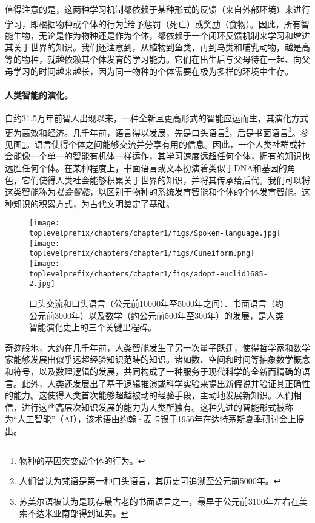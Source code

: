 \documentclass[../../book-main.tex]{subfiles}
\begin{document}
值得注意的是，这两种学习机制都依赖于某种形式的反馈（来自外部环境）来进行学习，即根据物种或个体的行为\footnote{物种的基因突变或个体的行为。}给予惩罚（死亡）或奖励（食物）。因此，所有智能生物，无论是作为物种还是作为个体，都依赖于一个闭环反馈机制来学习和增进其关于世界的知识。我们还注意到，从植物到鱼类，再到鸟类和哺乳动物，越是高等的物种，就越依赖其个体发育的学习能力。它们在出生后与父母待在一起、向父母学习的时间越来越长，因为同一物种的个体需要在极为多样的环境中生存。

\paragraph{人类智能的演化。}

自约31.5万年前智人出现以来，一种全新且更高形式的智能应运而生，其演化方式更为高效和经济。几千年前，语言得以发展，先是口头语言\footnote{人们曾认为梵语是第一种口头语言，其历史可追溯至公元前5000年。}，后是书面语言\footnote{苏美尔语被认为是现存最古老的书面语言之一，最早于公元前3100年左右在美索不达米亚南部得到证实。}。参见图\ref{fig:human-intelligence}。语言使得个体之间能够交流并分享有用的信息。因此，一个人类社群或社会能像一个单一的智能有机体一样运作，其学习速度远超任何个体，拥有的知识也远胜任何个体。在某种程度上，书面语言或文本扮演着类似于DNA和基因的角色，它们使得人类社会能够积累关于世界的知识，并将其传承给后代。我们可以将这类智能称为{\em 社会智能}，以区别于物种的系统发育智能和个体的个体发育智能。这种知识的积累方式，为古代文明奠定了基础。
\begin{figure}
    \centering
    \texttt{[image: \\toplevelprefix/chapters/chapter1/figs/Spoken-language.jpg]}
   \hspace{5mm} \texttt{[image: \\toplevelprefix/chapters/chapter1/figs/Cuneiform.png]}
   \hspace{5mm} \texttt{[image: \\toplevelprefix/chapters/chapter1/figs/adopt-euclid1685-2.jpg]}
    \caption{口头交流和口头语言（公元前10000年至5000年之间）、书面语言（约公元前3000年）以及数学（约公元前500年至300年）的发展，是人类智能演化史上的三个关键里程碑。}
    \label{fig:human-intelligence}
\end{figure}

奇迹般地，大约在几千年前，人类智能发生了另一次量子跃迁，使得哲学家和数学家能够发展出似乎远超经验知识范畴的知识。诸如数、空间和时间等抽象数学概念和符号，以及数理逻辑的发展，共同构成了一种服务于现代科学的全新而精确的语言。此外，人类还发展出了基于逻辑推演或科学实验来提出新假说并验证其正确性的能力。这使得人类首次能够超越被动的经验手段，主动地发展新知识。人们相信，进行这些高层次知识发展的能力为人类所独有。这种先进的智能形式被称为“人工智能”（AI），该术语由约翰·麦卡锡于1956年在达特茅斯夏季研讨会上提出。
\end{document}
